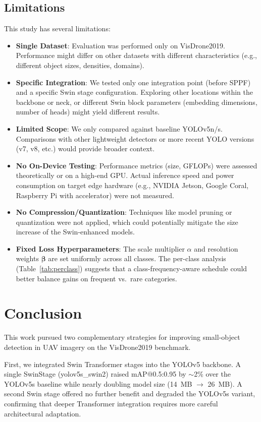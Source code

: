 \documentclass[conference]{IEEEtran}
\begin{document}
\subsection{Limitations}
This study has several limitations:
\begin{itemize}
\item \textbf{Single Dataset}: Evaluation was performed only on VisDrone2019. Performance might differ on other datasets with different characteristics (e.g., different object sizes, densities, domains).
\item \textbf{Specific Integration}: We tested only one integration point (before SPPF) and a specific Swin stage configuration. Exploring other locations within the backbone or neck, or different Swin block parameters (embedding dimensions, number of heads) might yield different results.
\item \textbf{Limited Scope}: We only compared against baseline YOLOv5n/s. Comparisons with other lightweight detectors or more recent YOLO versions (v7, v8, etc.) would provide broader context.
\item \textbf{No On-Device Testing}: Performance metrics (size, GFLOPs) were assessed theoretically or on a high-end GPU. Actual inference speed and power consumption on target edge hardware (e.g., NVIDIA Jetson, Google Coral, Raspberry Pi with accelerator) were not measured.
\item \textbf{No Compression/Quantization}: Techniques like model pruning or quantization were not applied, which could potentially mitigate the size increase of the Swin-enhanced models.
\item \textbf{Fixed Loss Hyperparameters}: The scale multiplier $\alpha$ and
  resolution weights $\boldsymbol{\beta}$ are set uniformly across all
  classes.  The per-class analysis (Table~\ref{tab:perclass}) suggests that
  a class-frequency-aware schedule could better balance gains on frequent
  vs.\ rare categories.
\end{itemize}

\section{Conclusion}

This work pursued two complementary strategies for improving small-object
detection in UAV imagery on the VisDrone2019 benchmark.

First, we integrated Swin Transformer stages into the YOLOv5 backbone.
A single SwinStage (yolov5s\_swin2) raised mAP@0.5:0.95 by $\sim$2\% over
the YOLOv5s baseline while nearly doubling model size (14~MB $\to$ 26~MB).
A second Swin stage offered no further benefit and degraded the YOLOv5s
variant, confirming that deeper Transformer integration requires more careful
architectural adaptation.
\end{document}
